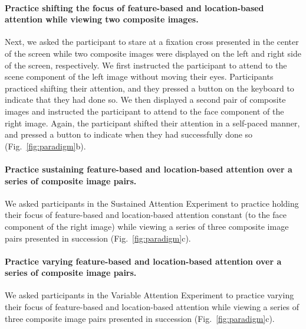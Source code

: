 \documentclass[english]{article}
\begin{document}
\paragraph{Practice shifting the focus of feature-based and location-based attention while viewing two composite images.}
Next, we asked the participant to stare at a fixation cross presented in the center of the screen while two composite images were displayed on the left and right side of the screen, respectively.  We first instructed the participant to attend to the scene component of the left image without moving their eyes.  Participants practiced shifting their attention, and they pressed a button on the keyboard to indicate that they had done so. We then displayed a second pair of composite images and instructed the participant to attend to the face component of the right image. Again, the participant shifted their attention in a self-paced manner, and pressed a button to indicate when they had successfully done so (Fig.~\ref{fig:paradigm}b).

\paragraph{Practice sustaining feature-based and location-based attention over a series of composite image pairs.}
We asked participants in the Sustained Attention Experiment to practice holding their focus of feature-based and location-based attention constant (to the face component of the right image) while viewing a series of three composite image pairs presented in succession (Fig.~\ref{fig:paradigm}c).

\paragraph{Practice varying feature-based and location-based attention over a series of composite image pairs.}
We asked participants in the Variable Attention Experiment to practice varying their focus of feature-based and location-based attention while viewing a series of three composite image pairs presented in succession (Fig.~\ref{fig:paradigm}c).
\end{document}
